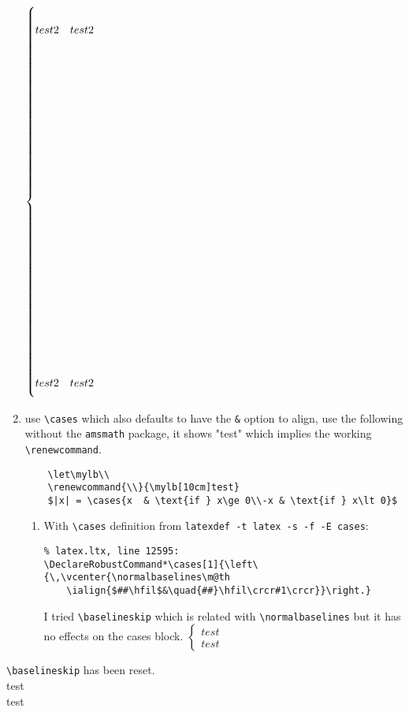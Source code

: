 \documentclass{article}
\begin{document}
\begin{enumerate}
          \renewenvironment{CondensedCases}{%
          \left\lbrace
          \def\arraystretch{3}%
          \array{@{}l@{\quad}l@{}}%
          }{%
          \endarray\right.%
          }

          \let\mylb\\
          \renewcommand{\\}{\mylb[10cm]}

          $\begin{CondensedCases}
                  test2 & test2\\
                  test2 & test2
              \end{CondensedCases}$
    \item use \verb|\cases| which also defaults to have the \verb|&| option to align, use the following without the \verb|amsmath| package, it shows "test" which implies the working \verb|\renewcommand|.
          \begin{verbatim}
    \let\mylb\\
    \renewcommand{\\}{\mylb[10cm]test}
    $|x| = \cases{x  & \text{if } x\ge 0\\-x & \text{if } x\lt 0}$
\end{verbatim}
          \begin{enumerate}
              \item With \verb|\cases| definition from \verb|latexdef -t latex -s -f -E cases|:
                    \begin{verbatim}
% latex.ltx, line 12595:
\DeclareRobustCommand*\cases[1]{\left\{\,\vcenter{\normalbaselines\m@th
    \ialign{$##\hfil$&\quad{##}\hfil\crcr#1\crcr}}\right.}
\end{verbatim}
                    \setlength{\baselineskip}{12pt}
                    I tried \verb|\baselineskip| which is related with \verb|\normalbaselines| but it has no effects on the cases block.
                    \setlength{\baselineskip}{120pt}
                    $\begin{cases}
                            test \\
                            test
                        \end{cases}$
          \end{enumerate}

\end{enumerate}
\setlength{\baselineskip}{12pt}
\verb|\baselineskip| has been reset. \\
test\\test
\end{document}
